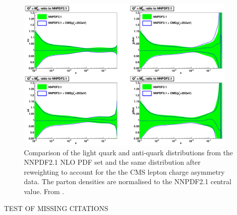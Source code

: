 \begin{figure}[htbp]
  \begin{center}
  \includegraphics*[width=0.95\textwidth]{effect}
  \caption{Comparison of the light quark and anti-quark distributions from the
NNPDF2.1 NLO PDF set and the same distribution after reweighting to account for
the the CMS lepton charge asymmetry data. The parton densities are normalised to
the NNPDF2.1 central value.  From \cite{Ball:2011gg}. }
  \label{fig:combined}
  \end{center}
\end{figure}



TEST OF MISSING CITATIONS
\cite{t1972regularization}
\cite{glashow1961partial}
\cite{weinberg1967model}
\cite{salam1968weak}
\cite{englert1964broken}
\cite{higgs1981broken}
\cite{guralnik1964global}
\cite{chatrchyan2012observation}
\cite{aad2012observation}
\cite{aitchison2004gauge}
\cite{halzen1984quarks}
\cite{griffiths2008introduction}
\cite{perkins2000introduction}
\cite{ral}
\cite{martin}
\cite{kom}
\cite{catani}
\cite{martin2009parton}
\cite{lai2010vv}
\cite{Lionetti:2011pw}
\cite{aaron2010combined}
\cite{campbellmcfm}
\cite{hepdata}
\cite{Bourilkov:2006cj}
\cite{cdfWAsym}
\cite{d0WAsym}
\cite{lhc}
\cite{myers1990design}
\cite{intlumi}
\cite{chatrchyan2008cms}
\cite{SketchUpCMSGallery}
\cite{ecal1997technical}
\cite{grandi2004cms}
\cite{aad2008atlas}
\cite{alves2008lhcb}
\cite{aamodt2008alice}
\cite{adriani2008lhcf}
\cite{anelli2008totem}
\cite{myers2010lhc}
\cite{lebrun2009sector}
\cite{froidevaux2006general}
\cite{campbell2006hard}
\cite{baffioni2007electron}
\cite{adam2009electron}
\cite{meschi2001electron}
\cite{simplecutbasedeleid}
\cite{nikos}
\cite{daskalakis2009data}
\cite{baffioni2009identification}
\cite{gsf}
\cite{cmsgsf}
\cite{kalman}
\cite{PF}
\cite{bethe}
\cite{barge2009conversion}
\cite{collaboration2010muon}
\cite{collaboration2012tau}
\cite{asym36}
\cite{code}
\cite{baisini2010electron} 
\cite{monchenault2011predictions} 
\cite{majumder2010muon} 
\cite{adam2009tag} 
\cite{adam2007towards}
\cite{alcaraz2010updated}
\cite{asym840}
\cite{bendavid2011electron} 
\cite{Ball:2011gg}






